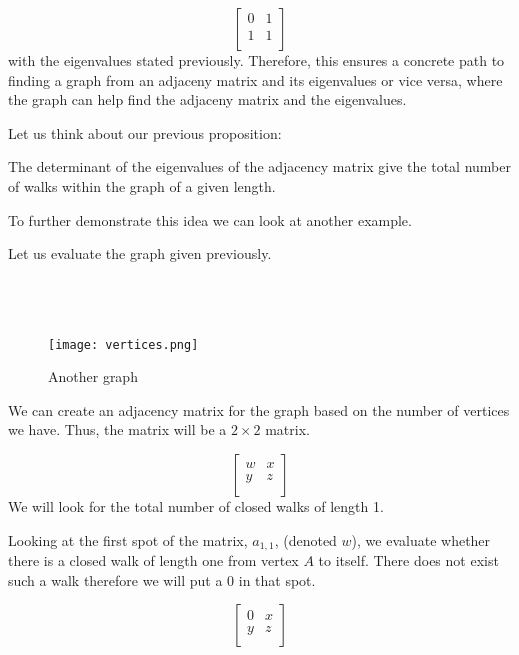   $$
\begin{bmatrix} 
     0        &         1     \\
     1        &         1      \\

\end{bmatrix}
$$
 with the eigenvalues stated previously. Therefore, this ensures a concrete path to finding a graph from an adjaceny matrix and its eigenvalues or vice versa, where the graph can help find the adjaceny matrix and the eigenvalues.

Let us think about our previous proposition:

\begin{proposition}
    The determinant of the eigenvalues of the adjacency matrix give the total number of walks within the graph of a given length. 
\end{proposition}

To further demonstrate this idea we can look at another example. 
\par Let us evaluate the graph given previously.\\\\\\\
\begin{figure}[h]
         \centering
         \texttt{[image: vertices.png]}
         \caption{\small{Another graph}}
 \end{figure}

We can create an adjacency matrix for the graph based on the number of vertices we have.  Thus, the matrix will be a $2\times2$ matrix. 

$$
\begin{bmatrix}
     w        &         x     \\
     y        &         z      \\
\end{bmatrix}
$$
We will look for the total number of closed walks of length 1. 
\par
Looking at the first spot of the matrix, $a_{1,1}$, (denoted $w$), we evaluate whether there is a closed walk of length one from vertex $A$ to itself. There does not exist such a walk therefore we will put a 0 in that spot.


$$
\begin{bmatrix}
     0        &         x     \\
     y        &         z      \\
\end{bmatrix}
$$

